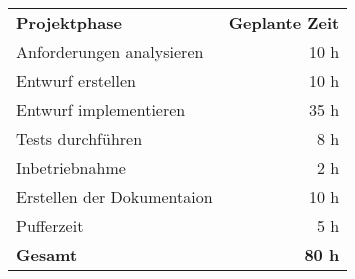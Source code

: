 \begin{tabular}{lr}
\rowcolor{heading}\textbf{Projektphase} & \textbf{Geplante Zeit} \\
Anforderungen analysieren & 10 h \\
\rowcolor{odd}Entwurf erstellen & 10 h \\
Entwurf implementieren & 35 h \\
\rowcolor{odd}Tests durchführen & 8 h \\
Inbetriebnahme & 2 h \\
\rowcolor{odd}Erstellen der Dokumentaion & 10 h \\
Pufferzeit & 5 h \\
\hline
\hline
\rowcolor{odd}\textbf{Gesamt} & \textbf{80 h} \\
\end{tabular}
